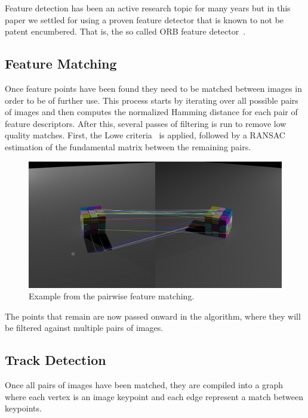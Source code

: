 \documentclass[preprint,acmtog]{acmart}
\begin{document}
Feature detection has been an active research topic for many years but in this
paper we settled for using a proven feature detector that is known to not be
patent encumbered. That is, the so called ORB feature detector~\cite{orb2011}.


\subsection{Feature Matching}

Once feature points have been found they need to be matched between images in
order to be of further use. This process starts by iterating over all possible
pairs of images and then computes the normalized Hamming distance for each pair
of feature descriptors. After this, several passes of filtering is run to remove
low quality matches. First, the Lowe criteria~\cite{sift2004} is applied,
followed by a RANSAC~\cite{ransac} estimation of the fundamental matrix between
the remaining pairs.

\begin{figure}[ht]
  \centering
  \includegraphics[width=1.0\linewidth]{matches_3}
  \caption{Example from the pairwise feature matching.}
\end{figure}



The points that remain are now passed onward in the algorithm, where they will
be filtered against multiple pairs of images.


\subsection{Track Detection}

Once all pairs of images have been matched, they are compiled into a graph where
each vertex is an image keypoint and each edge represent a match between
keypoints.
\end{document}
